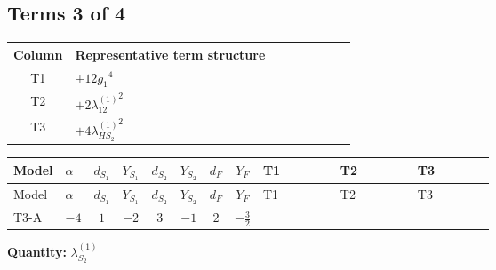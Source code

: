 \documentclass[8pt]{article}
\begin{document}
\begin{landscape}
\subsection*{Terms 3 of 4}
\begin{center}
\begin{tabular}{@{}c >{\raggedright\arraybackslash}p{0.82\linewidth}@{}}
\toprule
Column & Representative term structure \\
\midrule
T1 & \(\displaystyle +12 {g_1}^4\) \\
\midrule
T2 & \(\displaystyle +2 {\lambda_{12}^{(1)}}^2\) \\
\midrule
T3 & \(\displaystyle +4 {\lambda_{HS_2}^{(1)}}^2\) \\
\midrule
\bottomrule
\end{tabular}
\end{center}
\smallskip
\tiny
\begin{longtable}{@{}llcccccc >{\raggedright\arraybackslash}p{0.21\linewidth} >{\raggedright\arraybackslash}p{0.21\linewidth} >{\raggedright\arraybackslash}p{0.21\linewidth}@{}}
\toprule
Model & $\alpha$ & $d_{S_1}$ & $Y_{S_1}$ & $d_{S_2}$ & $Y_{S_2}$ & $d_F$ & $Y_F$ & T1 & T2 & T3 \\
\midrule
\endfirsthead
\toprule
Model & $\alpha$ & $d_{S_1}$ & $Y_{S_1}$ & $d_{S_2}$ & $Y_{S_2}$ & $d_F$ & $Y_F$ & T1 & T2 & T3 \\
\midrule
\endhead
T3-A & $-4$ & $1$ & $-2$ & $3$ & $-1$ & $2$ & $-\frac{3}{2}$ & \scriptsize\adjustbox{max width=\linewidth}{$\begin{gathered} +12 {g_1}^4\end{gathered}$} & \scriptsize\adjustbox{max width=\linewidth}{$\begin{gathered} +2 {\lambda_{12}^{(1)}}^2\end{gathered}$} & \scriptsize\adjustbox{max width=\linewidth}{$\begin{gathered} +4 {\lambda_{HS_2}^{(1)}}^2\end{gathered}$} \\
\midrule
\bottomrule
\end{longtable}
\clearpage
\noindent\textbf{Quantity: }$\lambda_{S_2}^{(1)}$\par\smallskip

\end{landscape}
\end{document}

